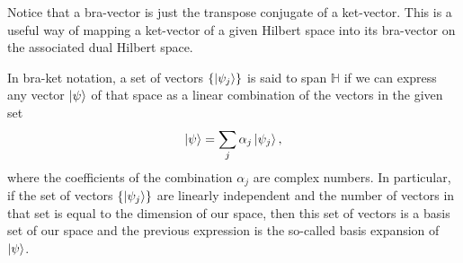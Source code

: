Notice that a bra-vector is just the transpose conjugate of a ket-vector. This is a useful way of mapping a ket-vector of a given Hilbert space into its bra-vector on the associated dual Hilbert space.
\begin{corollary}{}{}
    In bra-ket notation, a set of vectors $\{\ket{\psi_{j}}\}$ is said to span $\mathbb{H}$ if we can express any vector $\ket{\psi}$ of that space as a linear combination of the vectors in the given set
    \begin{equation}
        \ket{\psi} = \sum_{j}\alpha_{j}\ket{\psi_{j}},
    \end{equation}
    where the coefficients of the combination $\alpha_{j}$ are complex numbers. In particular, if the set of vectors $\{\ket{\psi_{j}}\}$ are linearly independent and the number of vectors in that set is equal to the dimension of our space, then this set of vectors is a basis set of our space and the previous expression is the so-called basis expansion of $\ket{\psi}$.
\end{corollary}
